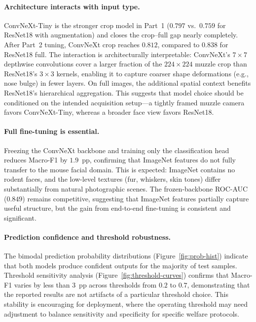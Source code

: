 \documentclass[sigconf]{acmart}
\begin{document}
\paragraph{Architecture interacts with input type.}
ConvNeXt-Tiny is the stronger crop model in Part~1 ($0.797$ vs.\ $0.759$ for
ResNet18 with augmentation) and closes the crop--full gap nearly completely.
After Part~2 tuning, ConvNeXt crop reaches $0.812$, compared to $0.838$ for
ResNet18 full. The interaction is architecturally interpretable: ConvNeXt's
$7\times7$ depthwise convolutions cover a larger fraction of the $224\times224$
muzzle crop than ResNet18's $3\times3$ kernels, enabling it to capture
coarser shape deformations (e.g., nose bulge) in fewer layers. On full images,
the additional spatial context benefits ResNet18's hierarchical aggregation.
This suggests that model choice should be conditioned on the intended
acquisition setup---a tightly framed muzzle camera favors ConvNeXt-Tiny,
whereas a broader face view favors ResNet18.

\paragraph{Full fine-tuning is essential.}
Freezing the ConvNeXt backbone and training only the classification head
reduces Macro-F1 by $1.9$~pp, confirming that ImageNet features do not fully
transfer to the mouse facial domain. This is expected: ImageNet contains no
rodent faces, and the low-level textures (fur, whiskers, skin tones) differ
substantially from natural photographic scenes. The frozen-backbone
ROC-AUC ($0.849$) remains competitive, suggesting that ImageNet features
partially capture useful structure, but the gain from end-to-end fine-tuning
is consistent and significant.

\paragraph{Prediction confidence and threshold robustness.}
The bimodal prediction probability distributions (Figure~\ref{fig:prob-hist})
indicate that both models produce confident outputs for the majority of test
samples. Threshold sensitivity analysis (Figure~\ref{fig:threshold-curves})
confirms that Macro-F1 varies by less than $3$~pp across thresholds from $0.2$
to $0.7$, demonstrating that the reported results are not artifacts of a
particular threshold choice. This stability is encouraging for deployment,
where the operating threshold may need adjustment to balance sensitivity and
specificity for specific welfare protocols.
\end{document}
